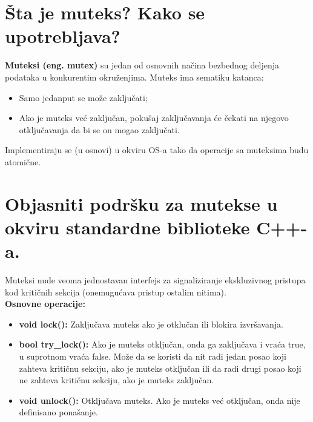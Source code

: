 \documentclass[a4paper]{article}
\begin{document}
\section{Šta je muteks? Kako se upotrebljava?}
  \textbf{Muteksi (eng. mutex)} su jedan od osnovnih načina bezbednog deljenja podataka u 
  konkurentim okruženjima. Muteks ima sematiku katanca:
    \begin{itemize}
      \item Samo jedanput se može zaključati;
      \item Ako je muteks već zaključan, pokušaj zaključavanja će čekati na njegovo 
            otključavanja da bi se on mogao zaključati.
    \end{itemize}
  Implementiraju se (u osnovi) u okviru OS-a tako da operacije sa muteksima budu atomične.

\section{Objasniti podršku za mutekse u okviru standardne biblioteke C++-a.}
  Muteksi nude veoma jednostavan interfejs za signaliziranje 
  ekskluzivnog pristupa kod kritičnih sekcija (onemugućava pristup ostalim nitima).\\
  \textbf{Osnovne operacije:}
  \begin{itemize}
    \item \textbf{void lock():} Zaključava muteks ako je otklučan ili blokira izvršavanja.
    \item \textbf{bool try\_lock():} Ako je muteks otključan, onda ga zaključava i vraća
          true, u suprotnom vraća false. Može da se koristi da nit radi jedan posao
          koji zahteva kritičnu sekciju, ako je muteks otključan ili da radi drugi posao
          koji ne zahteva kritičnu sekciju, ako je muteks zaključan.
    \item \textbf{void unlock():} Otključava muteks. Ako je muteks već otključan, onda nije
          definisano ponašanje.\cite{cppref_mutex}
  \end{itemize}
\end{document}
